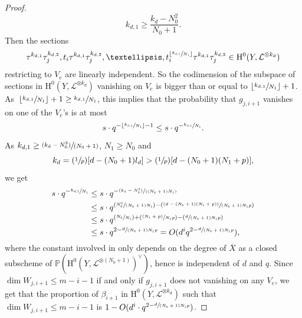 \documentclass[11pt]{article}
\numberwithin{equation}{section}
\newcommand{\Psfrac}[2]{(\sfrac{#1}{#2})}
\newcommand{\Ppsfrac}[2]{(\sfrac{(#1)}{#2})}
\newcommand{\pspfrac}[2]{\sfrac{(#1)}{(#2)}}
\theoremstyle{plain}
\theoremstyle{definition}
\newcommand{\ho}{\mathrm{H}}
\newcommand{\li}{\mathcal{L}}
\newcommand{\pr}{\mathbb{P}}
\begin{document}
\begin{proof}[Proof]
\[
k_{d,1}\geq \frac{k_d-N_0^2}{N_0+1}.
\]
Then the sections
\[
\tau^{k_{d,1}}\tau_j^{k_{d,2}}, t_i\tau^{k_{d,1}}\tau_j^{k_{d,2}},\dots, t_i^{\lfloor \sfrac{k_{d,1}}{N_1} \rfloor}\tau^{k_{d,1}}\tau_j^{k_{d,2}}\in \ho^0(Y, \li^{\otimes k_d})
\]
restricting to $V_e$ are linearly independent. So the codimension of the subspace of sections in $\ho^0(Y, \li^{\otimes k_d})$ vanishing on $V_e$ is bigger than or equal to $\lfloor \sfrac{k_{d,1}}{N_1} \rfloor+1$. As~$\lfloor \sfrac{k_{d,1}}{N_1} \rfloor+1\geq \sfrac{k_{d,1}}{N_1} $, this implies that the probability that $g_{j, i+1}$ vanishes on one of the $V_e$'s is at most
\[
s\cdot q^{-\lfloor \sfrac{k_{d,1}}{N_1} \rfloor-1}\leq s\cdot q^{-\sfrac{k_{d,1}}{N_1}}.
\]
As $k_{d,1}\geq \pspfrac{k_d-N_0^2}{N_0+1}$, $N_1\geq N_0$ and
\[
k_d=\Psfrac{1}{p}[d-(N_0+1)l_d]>\Psfrac{1}{p}[d-(N_0+1)(N_1+p)],
\]
we get
\begin{align*}
s\cdot q^{- \sfrac{k_{d,1}}{N_1}}&\leq s\cdot q^{-\pspfrac{k_d-N_0^2}{(N_0+1)N_1}}\\
&\leq s\cdot q^{\Psfrac{N_0^2}{(N_0+1)N_1}-\Ppsfrac{d-(N_0+1)(N_1+p)}{ (N_0+1)N_1p}}\\
&\leq s\cdot q^{\Psfrac{N_0}{N_1}+\Ppsfrac{N_1+p}{N_1p}-\Psfrac{d}{ (N_0+1)N_1p}}\\
&\leq s\cdot q^{2-\sfrac{d}{ (N_0+1)N_1p}}=O(d^i q^{2-\sfrac{d}{ (N_0+1)N_1p}}),
\end{align*}
where the constant involved in only depends on the degree of $\overline{X}$ as a closed subscheme of $\pr(\ho^0(Y, \li^{\otimes (N_0+1)})^{\vee})$, hence is independent of $d$ and $q$. Since $\dim W_{j,i+1} \leq m-i-1$ if and only if $g_{j,i+1}$ does not vanishing on any $V_e$, we get that the proportion of $\beta_{i+1}$ in $\ho^0(Y,\mathcal{L}^{\otimes k_d})$ such that $\dim W_{j,i+1} \leq m-i-1$ is $1-O(d^i\cdot q^{2-\sfrac{d}{(N_0+1)N_1p}})$.
\end{proof}
\end{document}
